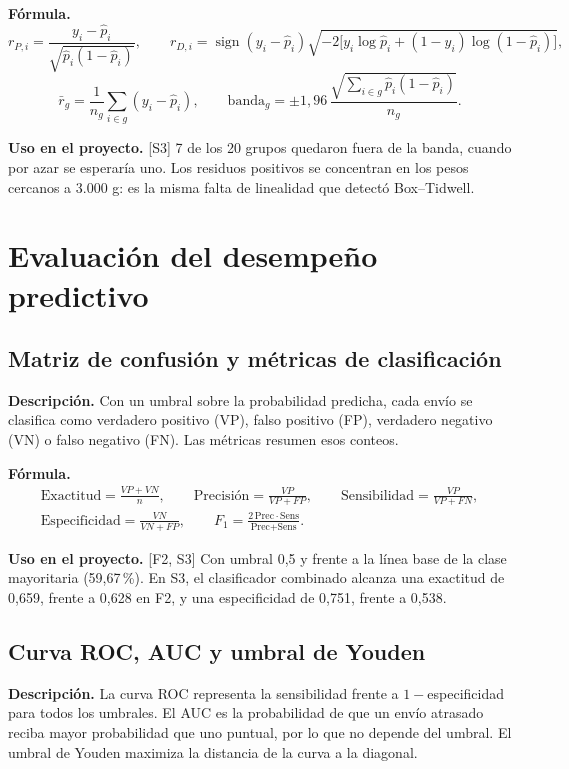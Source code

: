 \documentclass[11pt,a4paper]{article}
\newcommand{\desc}{\textbf{Descripción.} }
\newcommand{\formula}{\textbf{Fórmula.} }
\newcommand{\uso}{\textbf{Uso en el proyecto.} }
\newcommand{\fase}[1]{{\footnotesize\color{gris}[#1]}}
\begin{document}
\formula
\[
r_{P,i}=\frac{y_i-\hat p_i}{\sqrt{\hat p_i(1-\hat p_i)}},\qquad
r_{D,i}=\operatorname{sign}(y_i-\hat p_i)\sqrt{-2\big[y_i\log\hat p_i+(1-y_i)\log(1-\hat p_i)\big]},
\]
\[
\bar r_g=\frac1{n_g}\sum_{i\in g}(y_i-\hat p_i),\qquad \text{banda}_g=\pm1{,}96\,\frac{\sqrt{\sum_{i\in g}\hat p_i(1-\hat p_i)}}{n_g} .
\]

\uso \fase{S3} 7 de los 20 grupos quedaron fuera de la banda, cuando por azar se esperaría uno. Los residuos positivos se concentran en los pesos cercanos a 3.000 g: es la misma falta de linealidad que detectó Box--Tidwell.

\section{Evaluación del desempeño predictivo}\label{sec:evaluacion}

\subsection{Matriz de confusión y métricas de clasificación}
\desc Con un umbral sobre la probabilidad predicha, cada envío se clasifica como verdadero positivo (VP), falso positivo (FP), verdadero negativo (VN) o falso negativo (FN). Las métricas resumen esos conteos.

\formula
\begin{gather*}
\text{Exactitud}=\frac{VP+VN}{n},\qquad \text{Precisión}=\frac{VP}{VP+FP},\qquad \text{Sensibilidad}=\frac{VP}{VP+FN},\\
\text{Especificidad}=\frac{VN}{VN+FP},\qquad F_1=\frac{2\,\text{Prec}\cdot\text{Sens}}{\text{Prec}+\text{Sens}} .
\end{gather*}

\uso \fase{F2, S3} Con umbral 0,5 y frente a la línea base de la clase mayoritaria (59,67\,\%). En S3, el clasificador combinado alcanza una exactitud de 0,659, frente a 0,628 en F2, y una especificidad de 0,751, frente a 0,538.

\subsection{Curva ROC, AUC y umbral de Youden}
\desc La curva ROC representa la sensibilidad frente a $1-$especificidad para todos los umbrales. El AUC es la probabilidad de que un envío atrasado reciba mayor probabilidad que uno puntual, por lo que no depende del umbral. El umbral de Youden maximiza la distancia de la curva a la diagonal.
\end{document}
